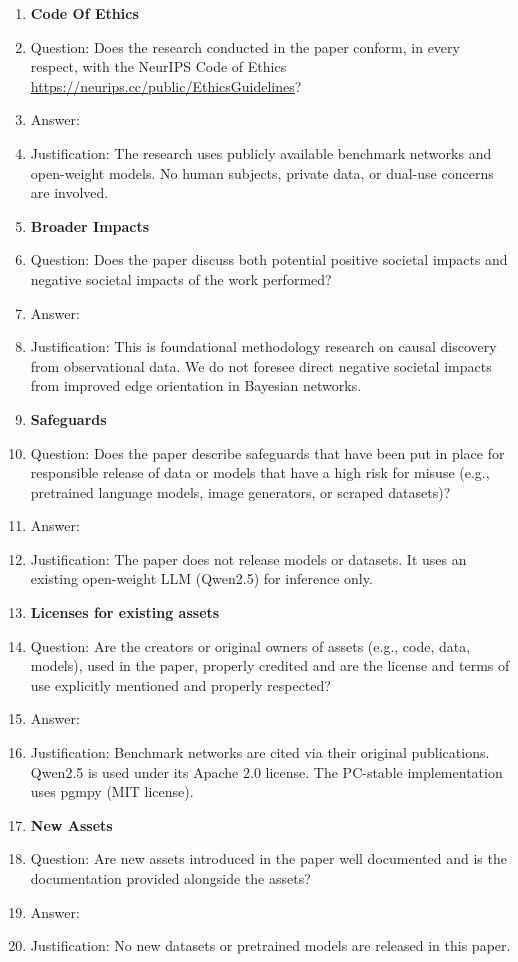 \begin{enumerate}
\item {\bf Code Of Ethics}
    \item[] Question: Does the research conducted in the paper conform, in every respect, with the NeurIPS Code of Ethics \url{https://neurips.cc/public/EthicsGuidelines}?
    \item[] Answer: \answerYes{}
    \item[] Justification: The research uses publicly available benchmark networks and open-weight models. No human subjects, private data, or dual-use concerns are involved.

\item {\bf Broader Impacts}
    \item[] Question: Does the paper discuss both potential positive societal impacts and negative societal impacts of the work performed?
    \item[] Answer: \answerNA{}
    \item[] Justification: This is foundational methodology research on causal discovery from observational data. We do not foresee direct negative societal impacts from improved edge orientation in Bayesian networks.

\item {\bf Safeguards}
    \item[] Question: Does the paper describe safeguards that have been put in place for responsible release of data or models that have a high risk for misuse (e.g., pretrained language models, image generators, or scraped datasets)?
    \item[] Answer: \answerNA{}
    \item[] Justification: The paper does not release models or datasets. It uses an existing open-weight LLM (Qwen2.5) for inference only.

\item {\bf Licenses for existing assets}
    \item[] Question: Are the creators or original owners of assets (e.g., code, data, models), used in the paper, properly credited and are the license and terms of use explicitly mentioned and properly respected?
    \item[] Answer: \answerYes{}
    \item[] Justification: Benchmark networks are cited via their original publications. Qwen2.5 is used under its Apache 2.0 license. The PC-stable implementation uses pgmpy (MIT license).

\item {\bf New Assets}
    \item[] Question: Are new assets introduced in the paper well documented and is the documentation provided alongside the assets?
    \item[] Answer: \answerNA{}
    \item[] Justification: No new datasets or pretrained models are released in this paper.


\end{enumerate}
